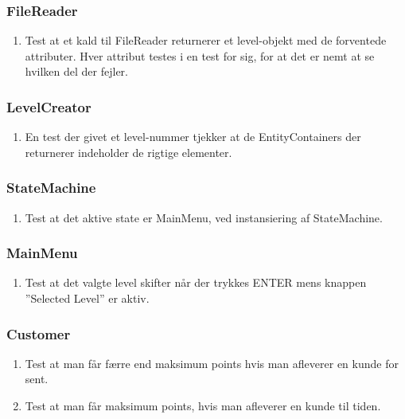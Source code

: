    \subsubsection{FileReader}
      \begin{enumerate}
         \item Test at et kald til FileReader returnerer et level-objekt med de forventede attributer. Hver attribut testes i en test for sig, for at det er nemt at se hvilken del der fejler.
      \end{enumerate}
   \subsubsection{LevelCreator}
      \begin{enumerate}
         \item En test der givet et level-nummer tjekker at de EntityContainers der returnerer indeholder de rigtige elementer.
      \end{enumerate}
   \subsubsection{StateMachine}
      \begin{enumerate}
         \item Test at det aktive state er MainMenu, ved instansiering af StateMachine.
      \end{enumerate}
   \subsubsection{MainMenu}
      \begin{enumerate}
         \item Test at det valgte level skifter når der trykkes ENTER mens knappen ''Selected Level'' er aktiv.
      \end{enumerate}
   \subsubsection{Customer}
      \begin{enumerate}
         \item Test at man får færre end maksimum points hvis man afleverer en kunde for sent.
         \item Test at man får maksimum points, hvis man afleverer en kunde til tiden.
      \end{enumerate}
